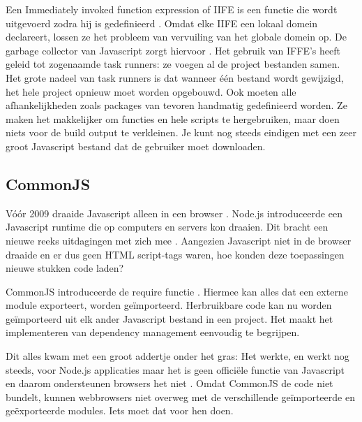 Een Immediately invoked function expression of IIFE is een functie die wordt uitgevoerd zodra hij is gedefinieerd \autocite{mozilla-2021B}. Omdat elke IIFE een lokaal domein declareert, lossen ze het probleem van vervuiling van het globale domein op. De garbage collector van Javascript zorgt hiervoor \autocite{mozilla-2021C}. Het gebruik van IFFE’s heeft geleid tot zogenaamde task runners: ze voegen al de project bestanden samen. Het grote nadeel van task runners is dat wanneer één bestand wordt gewijzigd, het hele project opnieuw moet worden opgebouwd. Ook moeten alle afhankelijkheden zoals \gls{packages} van tevoren handmatig gedefinieerd worden. Ze maken het makkelijker om functies en hele scripts te hergebruiken, maar doen niets voor de build output te verkleinen. Je kunt nog steeds eindigen met een zeer groot \gls{Javascript} bestand dat de gebruiker moet downloaden. 



\subsection{CommonJS}

Vóór 2009 draaide \gls{Javascript} alleen in een browser \autocite{wikipedia-no-date}. Node.js introduceerde een \gls{Javascript} runtime die op computers en servers kon draaien. Dit bracht een nieuwe reeks uitdagingen met zich mee \autocite{crutchfield-2018}. Aangezien \gls{Javascript} niet in de browser draaide en er dus geen \gls{HTML} script-tags waren, hoe konden deze toepassingen nieuwe stukken code laden? 

CommonJS introduceerde de require functie \autocite{nodejs-2021}. Hiermee kan alles dat een externe module exporteert, worden geïmporteerd. Herbruikbare code kan nu worden geïmporteerd uit elk ander \gls{Javascript} bestand in een project. Het maakt het implementeren van dependency management eenvoudig te begrijpen.

Dit alles kwam met een groot addertje onder het gras: Het werkte, en werkt nog steeds, voor Node.js applicaties maar het is geen officiële functie van \gls{Javascript} en daarom ondersteunen browsers het niet \autocite{crutchfield-2018}. Omdat CommonJS de code niet bundelt, kunnen webbrowsers niet overweg met de verschillende geïmporteerde en geëxporteerde modules. Iets moet dat voor hen doen. 



